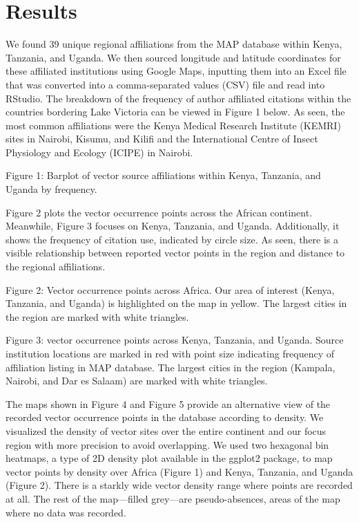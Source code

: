\documentclass[sn-nature]{sn-jnl}%
\begin{document}
\section*{Results}\label{results}
We found 39 unique regional affiliations from the MAP database within Kenya, Tanzania, and Uganda. We then sourced longitude and latitude coordinates for these affiliated institutions using Google Maps, inputting them into an Excel file that was converted into a comma-separated values (CSV) file and read into RStudio. The breakdown of the frequency of author affiliated citations within the countries bordering Lake Victoria can be viewed in Figure 1 below. As seen, the most common affiliations were the Kenya Medical Research Institute (KEMRI) sites in Nairobi, Kisumu, and Kilifi and the International Centre of Insect Physiology and Ecology (ICIPE) in Nairobi. 


Figure 1: Barplot of vector source affiliations within Kenya, Tanzania, and Uganda by frequency. 

Figure 2 plots the vector occurrence points across the African continent. Meanwhile, Figure 3 focuses on Kenya, Tanzania, and Uganda. Additionally, it shows the frequency of citation use, indicated by circle size. As seen, there is a visible relationship between reported vector points in the region and distance to the regional affiliations.  



Figure 2: Vector occurrence points across Africa. Our area of interest (Kenya, Tanzania, and Uganda) is highlighted on the map in yellow. The largest cities in the region are marked with white triangles. 



Figure 3: vector occurrence points across Kenya, Tanzania, and Uganda. Source institution locations are marked in red with point size indicating frequency of affiliation listing in MAP database. The largest cities in the region (Kampala, Nairobi, and Dar es Salaam) are marked with white triangles. 

The maps shown in Figure 4 and Figure 5 provide an alternative view of the recorded vector occurrence points in the database according to density. We visualized the density of vector sites over the entire continent and our focus region with more precision to avoid overlapping. We used two hexagonal bin heatmaps, a type of 2D density plot available in the ggplot2 package, to map vector points by density over Africa (Figure 1) and Kenya, Tanzania, and Uganda (Figure 2). There is a starkly wide vector density range where points are recorded at all. The rest of the map—filled grey—are pseudo-absences, areas of the map where no data was recorded.  
\end{document}
